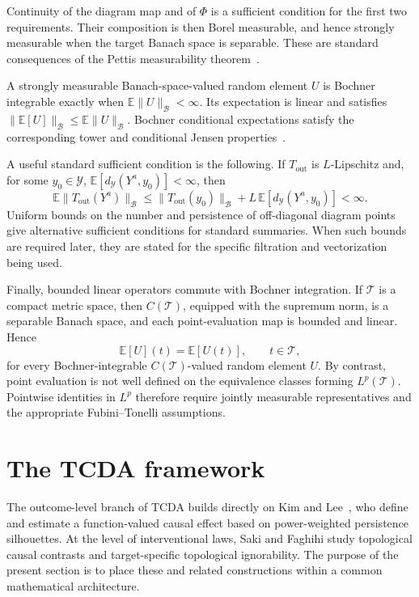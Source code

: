\documentclass[11pt,a4paper]{article}
\theoremstyle{plain}
\theoremstyle{definition}
\theoremstyle{remark}
\newcommand{\1}{\mathbbm{1}}
\begin{document}
Continuity of the diagram map and of \(\Phi\) is a sufficient condition for the first two requirements. Their composition is then Borel measurable, and hence strongly measurable when the target Banach space is separable. These are standard consequences of the Pettis measurability theorem~\citep{diesteluhl1977}.

A strongly measurable Banach-space-valued random element \(U\) is Bochner integrable exactly when \(\mathbb E\|U\|_{\mathcal B}<\infty\). Its expectation is linear and
satisfies
\(\|\mathbb E[U]\|_{\mathcal B} \leq \mathbb E\|U\|_{\mathcal B}\). Bochner conditional expectations satisfy the corresponding tower and conditional Jensen properties~\citep{diesteluhl1977}.

A useful standard sufficient condition is the following. If
\(T_{\mathrm{out}}\) is \(L\)-Lipschitz and, for some
\(y_0\in\mathcal Y\), \(\mathbb E[d_{\mathcal Y}(Y^a,y_0)]<\infty\), then
\[
\mathbb E\|T_{\mathrm{out}}(Y^a)\|_{\mathcal B}
\leq
\|T_{\mathrm{out}}(y_0)\|_{\mathcal B}
+
L\,\mathbb E[d_{\mathcal Y}(Y^a,y_0)]
<
\infty.
\]
Uniform bounds on the number and persistence of off-diagonal diagram points give alternative sufficient conditions for standard summaries. When such bounds are required later, they are stated for the specific filtration and vectorization being used.

Finally, bounded linear operators commute with Bochner integration. If \(\mathcal T\) is a compact metric space, then
\(C(\mathcal T)\), equipped with the supremum norm, is a separable Banach space, and each point-evaluation map is bounded and linear. Hence
\[
\mathbb E[U](t)
=
\mathbb E[U(t)],
\qquad
t\in\mathcal T,
\]
for every Bochner-integrable \(C(\mathcal T)\)-valued random element \(U\). By contrast, point evaluation is not well defined on the equivalence classes forming \(L^p(\mathcal T)\). Pointwise identities in \(L^p\) therefore require jointly measurable representatives and the appropriate Fubini--Tonelli assumptions.


\section{The TCDA framework}
\label{sec:tcda-framework}

The outcome-level branch of TCDA builds directly on Kim and
Lee~\citep{kimlee2026}, who define and estimate a function-valued causal effect based on power-weighted persistence silhouettes. At the level of interventional laws, Saki and Faghihi \citep{sakifaghihi2026} study topological causal contrasts and target-specific topological ignorability. The purpose of the present section is to place these and related constructions within a common mathematical architecture.
\end{document}
